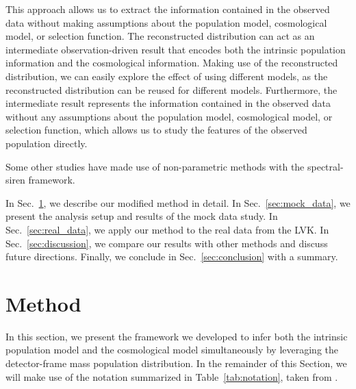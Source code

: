 \documentclass[sn-aps, pdflatex]{sn-jnl}
\begin{document}
This approach allows us to extract the information contained in the observed data without making assumptions about the population model, cosmological model, or selection function.
The reconstructed distribution can act as an intermediate observation-driven result that encodes both the intrinsic population information and the cosmological information.
Making use of the reconstructed distribution, we can easily explore the effect of using different models, as the reconstructed distribution can be reused for different models.
Furthermore, the intermediate result represents the information contained in the observed data without any assumptions about the population model, cosmological model, or selection function, which allows us to study the features of the observed population directly.

Some other studies have made use of non-parametric methods with the spectral-siren framework.

In Sec.~\ref{sec:method}, we describe our modified method in detail.
In Sec.~\ref{sec:mock_data}, we present the analysis setup and results of the mock data study.
In Sec.~\ref{sec:real_data}, we apply our method to the real data from the \ac{LVK}.
In Sec.~\ref{sec:discussion}, we compare our results with other methods and discuss future directions.
Finally, we conclude in Sec.~\ref{sec:conclusion} with a summary.

\section{Method}
\label{sec:method}

In this section, we present the framework we developed to infer both the intrinsic population model and the cosmological model simultaneously by leveraging the detector-frame mass population distribution.
In the remainder of this Section, we will make use of the notation summarized in Table~\ref{tab:notation}, taken from \cite{Rinaldi:2021bhm, Rinaldi:2022kyg}.
\end{document}
